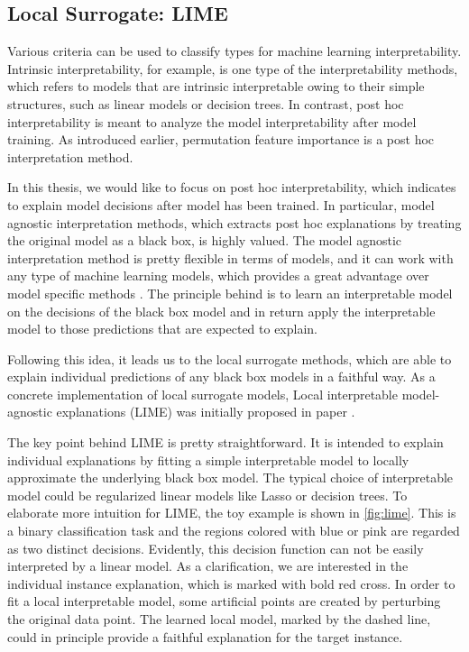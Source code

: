 \subsection{Local Surrogate: LIME}

Various criteria can be used to classify types for machine learning interpretability. Intrinsic interpretability, for example, is one type of the interpretability methods, which refers to models that are intrinsic interpretable owing to their simple structures, such as linear models or decision trees. In contrast, post hoc interpretability is meant to analyze the model interpretability after model training. As introduced earlier, permutation feature importance is a post hoc interpretation method. 
 
In this thesis, we would like to focus on post hoc interpretability, which indicates to explain model decisions after model has been trained. In particular, model agnostic interpretation methods, which extracts post hoc explanations by treating the original model as a black box, is highly valued. The model agnostic interpretation method is pretty flexible in terms of models, and it can work with any type of machine learning models, which provides a great advantage over model specific methods \cite{ribeiro2016model}. The principle behind is to learn an interpretable model on the decisions of the black box model and in return apply the interpretable model to those predictions that are expected to explain.  

Following this idea, it leads us to the local surrogate methods, which are able to explain individual predictions of any black box models in a faithful way. As a concrete implementation of local surrogate models, Local interpretable model-agnostic explanations (LIME) was initially proposed in paper \cite{ribeiro2016should}. 

The key point behind LIME is pretty straightforward. It is intended to explain individual explanations by fitting a simple interpretable model to locally approximate the underlying black box model. The typical choice of interpretable model could be regularized linear models like Lasso or decision trees. To elaborate more intuition for LIME, the toy example is shown in \ref{fig:lime}. This is a binary classification task and the regions colored with blue or pink are regarded as two distinct decisions. Evidently, this decision function can not be easily interpreted by a linear model. As a clarification, we are interested in the individual instance explanation, which is marked with bold red cross. In order to fit a local interpretable model, some artificial points are created by perturbing the original data point. The learned local model, marked by the dashed line, could in principle provide a faithful explanation for the target instance. 


